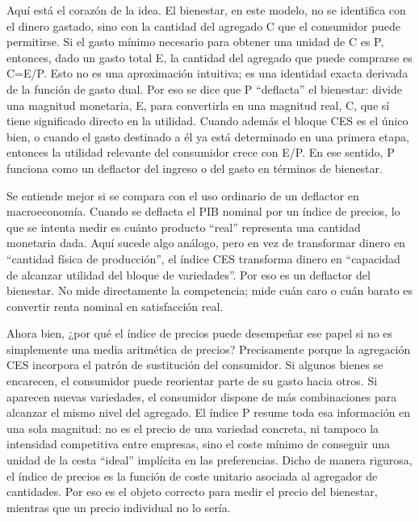 \documentclass[10pt,a4paper]{article}
\begin{document}
Aquí está el corazón de la idea. El bienestar, en este modelo, no se identifica con el dinero gastado, sino con la cantidad del agregado C que el consumidor puede permitirse. Si el gasto mínimo necesario para obtener una unidad de C es P, entonces, dado un gasto total E, la cantidad del agregado que puede comprarse es C=E/P. Esto no es una aproximación intuitiva; es una identidad exacta derivada de la función de gasto dual. Por eso se dice que P “deflacta” el bienestar: divide una magnitud monetaria, E, para convertirla en una magnitud real, C, que sí tiene significado directo en la utilidad. Cuando además el bloque CES es el único bien, o cuando el gasto destinado a él ya está determinado en una primera etapa, entonces la utilidad relevante del consumidor crece con E/P. En ese sentido, P funciona como un deflactor del ingreso o del gasto en términos de bienestar.

Se entiende mejor si se compara con el uso ordinario de un deflactor en macroeconomía. Cuando se deflacta el PIB nominal por un índice de precios, lo que se intenta medir es cuánto producto “real” representa una cantidad monetaria dada. Aquí sucede algo análogo, pero en vez de transformar dinero en “cantidad física de producción”, el índice CES transforma dinero en “capacidad de alcanzar utilidad del bloque de variedades”. Por eso es un deflactor del bienestar. No mide directamente la competencia; mide cuán caro o cuán barato es convertir renta nominal en satisfacción real.

Ahora bien, ¿por qué el índice de precios puede desempeñar ese papel si no es simplemente una media aritmética de precios? Precisamente porque la agregación CES incorpora el patrón de sustitución del consumidor. Si algunos bienes se encarecen, el consumidor puede reorientar parte de su gasto hacia otros. Si aparecen nuevas variedades, el consumidor dispone de más combinaciones para alcanzar el mismo nivel del agregado. El índice P resume toda esa información en una sola magnitud: no es el precio de una variedad concreta, ni tampoco la intensidad competitiva entre empresas, sino el coste mínimo de conseguir una unidad de la cesta “ideal” implícita en las preferencias. Dicho de manera rigurosa, el índice de precios es la función de coste unitario asociada al agregador de cantidades. Por eso es el objeto correcto para medir el precio del bienestar, mientras que un precio individual no lo sería.
\end{document}
